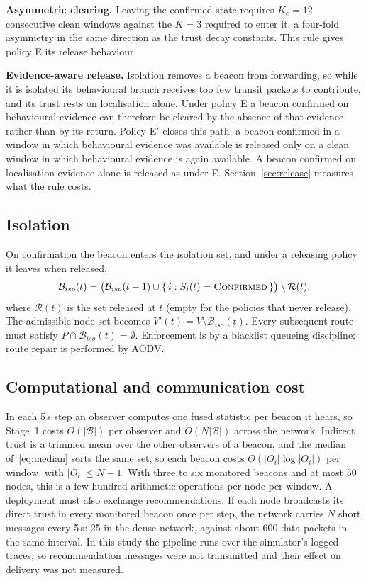 \documentclass[pdflatex,sn-mathphys-num]{sn-jnl}%
\theoremstyle{thmstyleone}%
\theoremstyle{thmstyletwo}%
\theoremstyle{thmstylethree}%
\begin{document}
\textbf{Asymmetric clearing.} Leaving the confirmed state requires $K_c = 12$
consecutive clean windows against the $K = 3$ required to enter it, a four-fold
asymmetry in the same direction as the trust decay constants. This rule gives
policy E its release behaviour.

\textbf{Evidence-aware release.} Isolation removes a beacon from forwarding, so
while it is isolated its behavioural branch receives too few transit packets
to contribute, and its trust rests on localisation alone. Under policy E a
beacon confirmed on behavioural evidence can therefore be cleared by the
absence of that evidence rather than by its return. Policy E$'$ closes this
path: a beacon confirmed in a window in which behavioural evidence was
available is released only on a clean window in which behavioural evidence is
again available. A beacon confirmed on localisation evidence alone is released
as under E. Section~\ref{sec:release} measures what the rule costs.

\subsection{Isolation}

On confirmation the beacon enters the isolation set, and under a releasing
policy it leaves when released,
\begin{equation}
\label{eq:iso}
\mathcal{B}_{iso}(t) = \bigl(\mathcal{B}_{iso}(t-1) \cup \{\, i : S_i(t) = \textsc{Confirmed} \,\}\bigr)
\setminus \mathcal{R}(t),
\end{equation}
where $\mathcal{R}(t)$ is the set released at $t$ (empty for the policies
that never release). The admissible node set becomes $V'(t) = V \setminus \mathcal{B}_{iso}(t)$.
Every subsequent route must satisfy $P \cap \mathcal{B}_{iso}(t) = \emptyset$.
Enforcement is by a blacklist queueing discipline; route repair is performed by
AODV.

\subsection{Computational and communication cost}
\label{sec:cost}

In each 5\,s step an observer computes one fused statistic per beacon it
hears, so Stage~1 costs $O(|\mathcal{B}|)$ per observer and
$O(N|\mathcal{B}|)$ across the network. Indirect trust is a trimmed mean over
the other observers of a beacon, and the median of~\eqref{eq:median} sorts the
same set, so each beacon costs $O(|O_i| \log |O_i|)$ per window, with
$|O_i| \le N-1$. With three to six monitored beacons and at most 50 nodes,
this is a few hundred arithmetic operations per node per window. A deployment
must also exchange recommendations. If each node broadcasts its direct trust
in every monitored beacon once per step, the network carries $N$ short
messages every 5\,s: 25 in the dense network, against about 600 data packets
in the same interval. In this study the pipeline runs over the simulator's
logged traces, so recommendation messages were not transmitted and their
effect on delivery was not measured.
\end{document}

